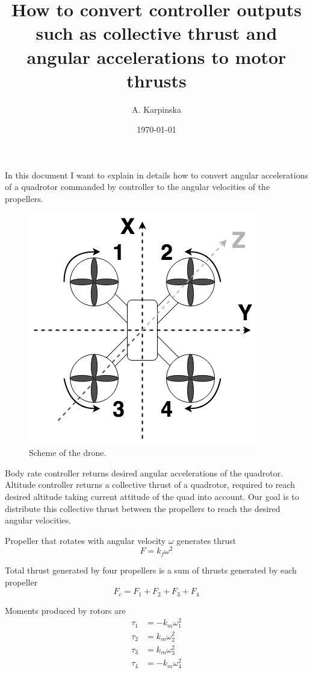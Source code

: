 \documentclass{article}
\title{How to convert controller outputs such as collective thrust and angular accelerations to motor thrusts}
\author{A. Karpinska}
\date{\today}
\begin{document}
    \maketitle

    In this document I want to explain in details how to convert angular accelerations of a quadrotor commanded by controller to the angular velocities of the propellers.

    \begin{figure}[h]
        \centering
        \includegraphics[scale=0.5]{drone.png}
        \caption{Scheme of the drone.}
    \end{figure}

    Body rate controller returns desired angular accelerations of the quadrotor. Altitude controller returns a collective thrust of a quadrotor, required to reach desired altitude taking current attitude of the quad into account. Our goal is to distribute this collective thrust between the propellers to reach the desired angular velocities.

    Propeller that rotates with angular velocity $\omega$ generates thrust
    \begin{equation*}
        F = k_f\omega^2
    \end{equation*}

    Total thrust generated by four propellers is a sum of thrusts generated by each propeller
    \begin{equation*}
        F_c = F_1+F_2+F_3+F_4
    \end{equation*}

    Moments produced by rotors are
    \begin{align*}
        \tau_1 &= -k_m\omega_1^2 \\
        \tau_2 &= k_m\omega_2^2 \\
        \tau_3 &= k_m\omega_3^2 \\
        \tau_4 &= -k_m\omega_4^2
    \end{align*}
\end{document}
